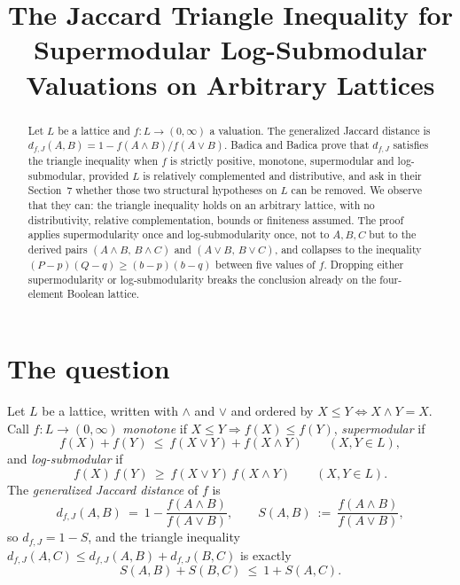 \documentclass[11pt]{amsart}
\title[Jaccard triangle inequality on arbitrary lattices]
{The Jaccard Triangle Inequality for Supermodular Log-Submodular Valuations
on Arbitrary Lattices}
\date{}
\theoremstyle{remark}
\newcommand{\Lat}{L}
\newcommand{\dJ}{d_{f,J}}
\begin{document}
\begin{abstract}
Let $\Lat$ be a lattice and $f\colon \Lat\to(0,\infty)$ a valuation. The
generalized Jaccard distance is
$\dJ(A,B)=1-f(A\wedge B)/f(A\vee B)$.
Badica and Badica prove that $\dJ$ satisfies the triangle inequality when $f$
is strictly positive, monotone, supermodular and log-submodular, provided
$\Lat$ is relatively complemented and distributive, and ask in their
Section~7 whether those two structural hypotheses on $\Lat$ can be removed. We
observe that they can: the triangle inequality holds on an arbitrary lattice,
with no distributivity, relative complementation, bounds or finiteness assumed.
The proof applies supermodularity once and log-submodularity once, not to
$A,B,C$ but to the derived pairs $(A\wedge B,\,B\wedge C)$ and
$(A\vee B,\,B\vee C)$, and collapses to the inequality
$(P-p)(Q-q)\ge(b-p)(b-q)$ between five values of $f$. Dropping either
supermodularity or log-submodularity breaks the conclusion already on the
four-element Boolean lattice.
\end{abstract}

\maketitle

\section{The question}

Let $\Lat$ be a lattice, written with $\wedge$ and $\vee$ and ordered by
$X\le Y\iff X\wedge Y=X$. Call $f\colon\Lat\to(0,\infty)$
\emph{monotone} if $X\le Y\Rightarrow f(X)\le f(Y)$,
\emph{supermodular} if
\begin{equation}\label{eq:super}
 f(X)+f(Y)\ \le\ f(X\vee Y)+f(X\wedge Y)
 \qquad(X,Y\in \Lat),
\end{equation}
and \emph{log-submodular} if
\begin{equation}\label{eq:logsub}
 f(X)\,f(Y)\ \ge\ f(X\vee Y)\,f(X\wedge Y)
 \qquad(X,Y\in \Lat).
\end{equation}
The \emph{generalized Jaccard distance} of $f$ is
\begin{equation}\label{eq:jac}
 \dJ(A,B)\ =\ 1-\frac{f(A\wedge B)}{f(A\vee B)},
 \qquad
 S(A,B)\ :=\ \frac{f(A\wedge B)}{f(A\vee B)},
\end{equation}
so $\dJ=1-S$, and the triangle inequality
$\dJ(A,C)\le\dJ(A,B)+\dJ(B,C)$ is exactly
\begin{equation}\label{eq:TI}
 S(A,B)+S(B,C)\ \le\ 1+S(A,C).
\end{equation}
\end{document}
